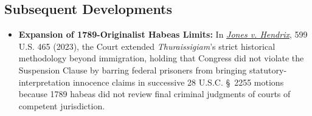 \documentclass[12pt]{article}
\begin{document}
\subsection{Subsequent Developments}

\begin{itemize}
  \item \textbf{Expansion of 1789-Originalist Habeas Limits:} In \href{https://supreme.justia.com/cases/federal/us/599/21-857/}{\textit{Jones v. Hendrix}}, 599 U.S. 465 (2023), the Court extended \textit{Thuraissigiam}'s strict historical methodology beyond immigration, holding that Congress did not violate the Suspension Clause by barring federal prisoners from bringing statutory-interpretation innocence claims in successive 28 U.S.C. \S\ 2255 motions because 1789 habeas did not review final criminal judgments of courts of competent jurisdiction.

\end{itemize}
\end{document}
